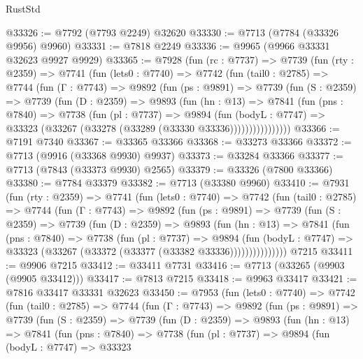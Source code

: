 \begin{lexlean}{RustStd}
\begin{coremodule}
@33326 := @7792 (@7793 @2249) @32620
@33330 := @7713 (@7784 (@33326 @9956) @9960)
@33331 := @7818 @2249
@33336 := @9965 (@9966 @33331 @32623 @9927 @9929)
@33365 := @7928
    (fun (rc : @7737) =>
    @7739
      (fun (rty : @2359) =>
      @7741
        (fun (lets0 : @7740) =>
        @7742
          (fun (tail0 : @2785) =>
          @7744
            (fun (Γ : @7743) =>
            @9892
              (fun (ps : @9891) =>
              @7739
                (fun (S : @2359) =>
                @7739
                  (fun (D : @2359) =>
                  @9893
                    (fun (hn : @13) =>
                    @7841
                      (fun (pns : @7840) =>
                      @7738
                        (fun (pl : @7737) =>
                        @9894
                          (fun (bodyL : @7747) =>
                          @33323 (@33267 (@33278 (@33289 (@33330 @33336))))))))))))))))
@33366 := @7191 @7340
@33367 := @33365 @33366
@33368 := @33273 @33366
@33372 := @7713 (@9916 (@33368 @9930) @9937)
@33373 := @33284 @33366
@33377 := @7713 (@7843 (@33373 @9930) @2565)
@33379 := @33326 (@7800 @33366)
@33380 := @7784 @33379
@33382 := @7713 (@33380 @9960)
@33410 := @7931
    (fun (rty : @2359) =>
    @7741
      (fun (lets0 : @7740) =>
      @7742
        (fun (tail0 : @2785) =>
        @7744
          (fun (Γ : @7743) =>
          @9892
            (fun (ps : @9891) =>
            @7739
              (fun (S : @2359) =>
              @7739
                (fun (D : @2359) =>
                @9893
                  (fun (hn : @13) =>
                  @7841
                    (fun (pns : @7840) =>
                    @7738
                      (fun (pl : @7737) =>
                      @9894
                        (fun (bodyL : @7747) =>
                        @33323 (@33267 (@33372 (@33377 (@33382 @33336)))))))))))))))
    @7215
@33411 := @9906 @7215
@33412 := @33411 @7731
@33416 := @7713 (@33265 (@9903 (@9905 @33412)))
@33417 := @7813 @7215
@33418 := @9963 @33417
@33421 := @7816 @33417 @33331 @32623
@33450 := @7953
    (fun (lets0 : @7740) =>
    @7742
      (fun (tail0 : @2785) =>
      @7744
        (fun (Γ : @7743) =>
        @9892
          (fun (ps : @9891) =>
          @7739
            (fun (S : @2359) =>
            @7739
              (fun (D : @2359) =>
              @9893
                (fun (hn : @13) =>
                @7841
                  (fun (pns : @7840) =>
                  @7738
                    (fun (pl : @7737) =>
                    @9894
                      (fun (bodyL : @7747) =>
                      @33323

\end{coremodule}
\end{lexlean}
